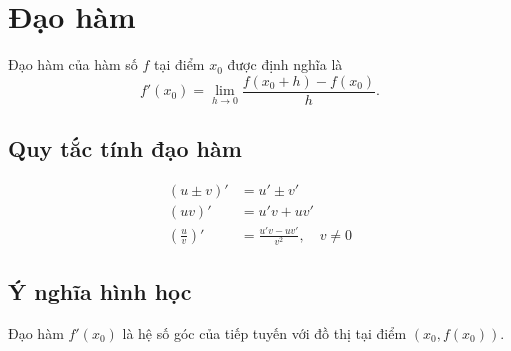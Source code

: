 \section{Đạo hàm}

Đạo hàm của hàm số $f$ tại điểm $x_0$ được định nghĩa là
\[
f'(x_0) = \lim_{h \to 0} \frac{f(x_0 + h) - f(x_0)}{h}.
\]

\subsection{Quy tắc tính đạo hàm}
\begin{align*}
(u \pm v)' &= u' \pm v' \\
(uv)' &= u'v + uv' \\
\left(\frac{u}{v}\right)' &= \frac{u'v - uv'}{v^2}, \quad v \neq 0
\end{align*}

\subsection{Ý nghĩa hình học}
Đạo hàm $f'(x_0)$ là hệ số góc của tiếp tuyến với đồ thị tại điểm $(x_0, f(x_0))$.

\begin{center}
\end{center}
